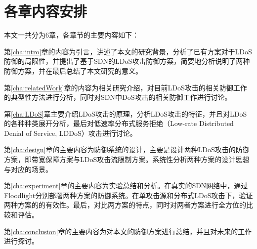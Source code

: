 \section{各章内容安排}
\label{sec:arrange}
本文一共分为6章，各章节的主要内容如下：

第\ref{cha:intro}章的内容为引言，讲述了本文的研究背景，分析了已有方案对于LDoS防御的局限性，并提出了基于SDN的LDoS攻击防御方案，简要地分析说明了两种防御方案，并在最后总结了本文研究的意义。

第\ref{cha:relatedWork}章的内容为相关研究介绍，对目前LDoS攻击的相关防御工作的典型性方法进行分析，同时对SDN中DoS攻击的相关防御工作进行讨论。

第\ref{cha:LDoS}章主要介绍LDoS攻击的原理，分析LDoS攻击的特征，并且对LDoS的各种种类展开分析，最后对低速率分布式服务拒绝（Low-rate Distributed Denial of Service, LDDoS）攻击进行讨论。

第\ref{cha:design}章的主要内容为防御系统的设计，主要是设计两种LDoS攻击的防御方案，即带宽保障方案与LDoS攻击流限制方案。系统性分析两种方案的设计思想与对应的场景。

第\ref{cha:experiment}章的主要内容为实验总结和分析。在真实的SDN网络中，通过Floodlight分别部署两种方案的防御系统。在单攻击源和分布式LDoS攻击下，验证两种方案的的有效性。最后，对比两方案的特点，同时对两者方案进行全方位的比较和评估。

第\ref{cha:conclusion}章的主要内容为对本文的防御方案进行总结，并且对未来的工作进行探讨。